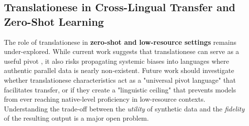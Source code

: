 \documentclass[11pt,a4paper]{article}
\begin{document}
\subsection{Translationese in Cross-Lingual Transfer and Zero-Shot Learning}

The role of translationese in \textbf{zero-shot and low-resource settings} remains under-explored. While current work suggests that translationese can serve as a useful pivot \cite{dabre2024pretraining, riley2020translationese}, it also risks propagating systemic biases into languages where authentic parallel data is nearly non-existent. Future work should investigate whether translationese characteristics act as a "universal pivot language" that facilitates transfer, or if they create a "linguistic ceiling" that prevents models from ever reaching native-level proficiency in low-resource contexts. Understanding the trade-off between the \textit{utility} of synthetic data and the \textit{fidelity} of the resulting output is a major open problem.
\end{document}
